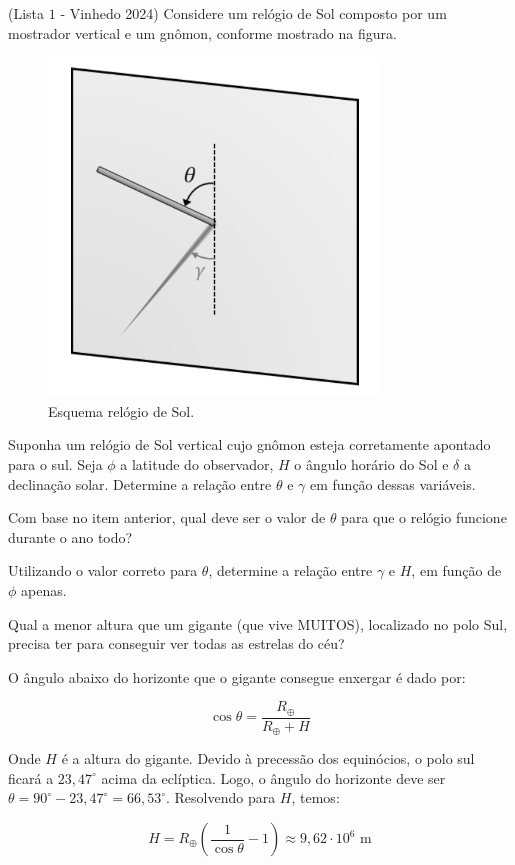 \documentclass[11pt]{article}
\begin{document}
\begin{pproblem} (Lista \(1\) - Vinhedo 2024) Considere um relógio de Sol composto por um mostrador vertical
    e um gnômon, conforme mostrado na figura.
    \begin{figure}[H]
        \centering
        \includegraphics{imagens/q20.png}
        \caption{Esquema relógio de Sol.}
    \end{figure}
    \begin{alternativas}
        \item Suponha um relógio de Sol vertical cujo gnômon esteja corretamente apontado para o sul.
        Seja \(\phi\) a latitude do observador, \(H\) o ângulo horário do Sol e \(\delta\) a declinação solar. Determine
        a relação entre \(\theta\) e \(\gamma\) em função dessas variáveis.
        
        \item Com base no item anterior, qual deve ser o valor de \(\theta\) para que o relógio funcione durante o ano todo?

        \item Utilizando o valor correto para \(\theta\), determine a relação entre \(\gamma\) e \(H\), em função de \(\phi\) apenas.
    \end{alternativas}
\end{pproblem}

\begin{pproblem}
    Qual a menor altura que um gigante (que vive MUITOS), localizado no polo Sul, precisa ter para conseguir ver todas as estrelas do céu?

    \begin{pssolution*}
        O ângulo abaixo do horizonte que o gigante consegue enxergar é dado por: 
    
        \[\cos\theta = \frac{R_\oplus}{R_\oplus + H}\]
    
        Onde \(H\) é a altura do gigante. Devido à precessão dos equinócios, o polo sul ficará a \(23,47^\circ\) acima da eclíptica. Logo, o ângulo do horizonte deve ser \(\theta = 90^\circ - 23,47^\circ = 66,53^\circ\). Resolvendo para \(H\), temos:
    
        \[\boxed{H = R_\oplus\left(\frac{1}{\cos\theta}-1\right) \approx 9,62\cdot 10^6\text{ m}}\]
    \end{pssolution*}
\end{pproblem}    
\end{document}
